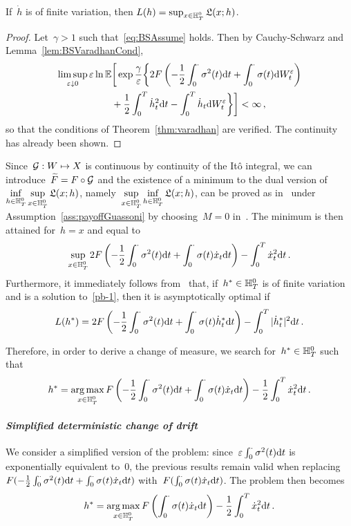 \begin{lemma}
If~$\dot{h}$ is of finite variation, then 
$L(h) = \sup_{x \in \mathbb{H}_T^0}\mathfrak{L}(x;h)$.
\end{lemma}
\begin{proof}
Let~$\gamma>1$ such that~\eqref{eq:BSAssume} holds. Then by Cauchy-Schwarz and Lemma~\ref{lem:BSVaradhanCond},
\begin{align*}
\limsup\limits_{\varepsilon\downarrow 0} \varepsilon \ln\mathbb{E}&\bigg[\exp\frac{\gamma}{\varepsilon}\bigg\{2F\left(-\frac{1}{2}\int_0^\cdot \sigma^2(t)\mathrm{d} t + \int_0^\cdot \sigma(t) \mathrm{d} W_t^\varepsilon\right) \\
&+ \frac{1}{2}\int_0^T \dot{h}_t^2\mathrm{d} t - \int_0^T \dot{h}_t \mathrm{d} W_t^{\varepsilon} \bigg\}\bigg] <\infty\,,
\end{align*}
so that the conditions of Theorem~\ref{thm:varadhan} are verified.
The continuity has already been shown.
\end{proof}
Since~$\mathcal{G}: W\mapsto X$ is continuous by continuity of the It\^{o} integral, we can introduce~$\widetilde F =\nobreak F\circ\mathcal{G}$ and the existence of a minimum to the dual version of 
$\inf\limits_{h \in \mathbb{H}_T^0} \sup\limits_{x \in \mathbb{H}_T^0} \mathfrak{L}(x;h)$,
namely~$\sup\limits_{x \in \mathbb{H}_T^0} \inf\limits_{h \in \mathbb{H}_T^0}\mathfrak{L}(x;h)$,
can be proved as in~\cite{Guasoni2007OptimalTime} under Assumption~\ref{ass:payoffGuassoni} by choosing~$M=0$ in~\cite[Lemma~7.1]{Guasoni2007OptimalTime}. 
The minimum is then attained  for~$h=x$ and equal to 
\begin{equation}\label{pb-1}
    \sup\limits_{x \in \mathbb{H}_T^0}2F\left(-\frac{1}{2}\int_0^\cdot \sigma^2(t)\mathrm{d} t + \int_0^\cdot \sigma(t) \dot{x}_t \mathrm{d} t\right)
 - \int_0^T \dot{x}_t^2 \mathrm{d} t\,.
\end{equation}
Furthermore, it immediately follows from~\cite[Theorem~3.6]{Guasoni2007OptimalTime} that, if~$h^*\in \mathbb{H}_T^0$ is of finite variation and is a solution to~\eqref{pb-1}, then it is asymptotically optimal if
$$
L(h^{*}) = 2F\left(-\frac{1}{2}\int_0^\cdot \sigma^2(t)\mathrm{d} t + \int_0^\cdot \sigma(t) \dot{h}^{*}_t \mathrm{d} t\right) - \int_0^T |\dot{h}^{*}_t|^2 \mathrm{d} t\,.
$$

Therefore, in order to derive a change of measure, we search for~$h^{*} \in \mathbb{H}_T^0$ such that
$$
h^{*} = \operatorname*{arg\,max}\limits_{x \in \mathbb{H}_T^0}F\left(-\frac{1}{2}\int_0^\cdot \sigma^2(t)\mathrm{d} t + \int_0^\cdot \sigma(t) \dot{x}_t \mathrm{d} t\right)
 - \frac{1}{2}\int_0^T \dot{x}_t^2 \mathrm{d} t\,.
$$

\paragraph{\textit{Simplified deterministic change of drift}}
We consider a simplified version of the problem:
since~$\varepsilon\int_0^\cdot\sigma^2(t)\mathrm{d} t$ is exponentially equivalent to~$0$, the previous results remain valid 
when replacing~$F(-\frac{1}{2}\int_0^\cdot \sigma^2(t)\mathrm{d} t + \int_0^\cdot \sigma(t) \dot{x}_t \mathrm{d} t)$ with~$F(\int_0^\cdot \sigma(t) \dot{x}_t \mathrm{d} t)$. 
The problem then becomes
$$
h^{*} = \operatorname*{arg\,max}\limits_{x \in \mathbb{H}_T^0} F\left(\int_0^\cdot \sigma(t) \dot{x}_t \mathrm{d} t\right) - \frac{1}{2}\int_0^T \dot{x}_t^2 \mathrm{d} t\,.
$$

